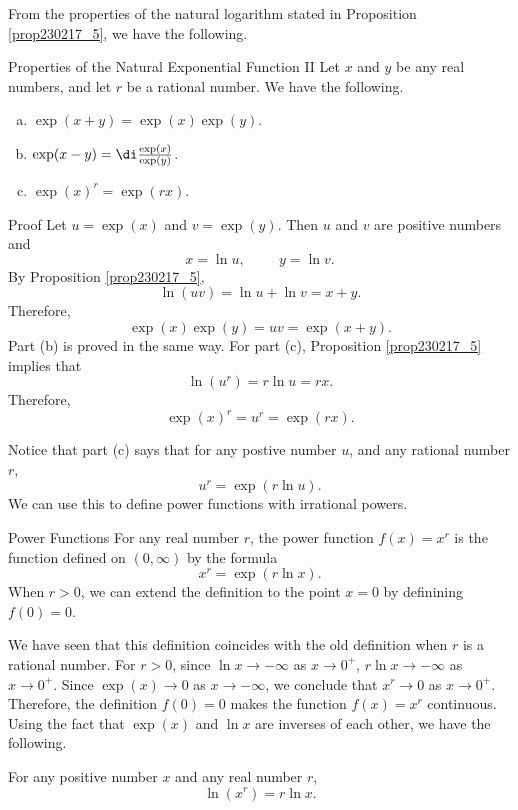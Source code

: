 From the properties of the natural logarithm stated in Proposition \ref{prop230217_5}, we have the following.
\begin{proposition}{Properties of the Natural Exponential Function II}
Let $x$ and $y$ be any real numbers, and let $r$ be a rational number. We have the following.
\begin{enumerate}[(a)]
\item $\exp(x+y)=\exp(x)\exp(y)$.
\item $\exp(x-y)=\di \frac{\exp(x)}{\exp(y)}$.
\item $\exp(x)^r=\exp(rx)$.\end{enumerate}
\end{proposition}
\begin{myproof}{Proof}
Let $u=\exp(x)$ and $v=\exp(y)$. Then $u$ and $v$ are positive numbers and
\[x=\ln u,\hspace{1cm}y=\ln v.\]
By Proposition \ref{prop230217_5},
\[\ln(uv)=\ln u+\ln v=x+y.\]\bp
Therefore,
\[\exp(x)\exp(y)=uv=\exp(x+y).\]
Part (b) is proved in the same way. For part (c),
Proposition \ref{prop230217_5} implies that
\[\ln(u^r)=r\ln u=rx.\]
Therefore,
\[\exp(x)^r=u^r=\exp(rx).\]
\end{myproof}

Notice that part (c) says that for any postive number $u$, and any rational number $r$, 
\[u^r=\exp(r\ln u).\]We can use this to define power functions with    irrational powers.
\begin{definition}{Power Functions}
For any real number $r$, the power function $f(x)=x^r$ is the function defined on $(0, \infty)$ by the formula
\[x^r=\exp(r\ln x).\] When $r>0$, we can extend the definition to the point $x=0$ by definining $f(0)=0$.
\end{definition}


We have seen that this definition coincides with the old definition when $r$ is a rational number. 
For $r>0$, since $\ln x\to -\infty$ as $x\to 0^+$, $r\ln x\to -\infty$ as $x\to 0^+$. Since $\exp(x)\to 0$ as $x\to -\infty$, we conclude that $x^r\to 0$ as $x\to 0^+$. Therefore, the definition $f(0)=0$ makes the function $f(x)=x^r$ continuous.
Using the fact that $\exp(x)$ and $\ln x$ are inverses of each other, we have the following.
\begin{highlight}{}
For any positive number $x$ and any real number $r$,
\[\ln (x^r)=r\ln x.\]
\end{highlight}


